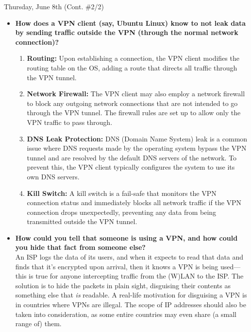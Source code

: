 \documentclass[11pt]{article}
\begin{document}
\begin{orangebox}{Thursday, June 8th (Cont. \#2/2)\vspace{-2em}\begin{flushright}\end{flushright}}
\begin{itemize}
    \item\textbf{How does a VPN client (say, Ubuntu Linux) know to not leak data by sending traffic outside the VPN (through the normal network connection)?}
    \begin{enumerate}
        \item\textbf{Routing:} Upon establishing a connection, the VPN client modifies the routing table on the OS, adding a route that directs all traffic through the VPN tunnel.
        \item\textbf{Network Firewall:} The VPN client may also employ a network firewall to block any outgoing network connections that are not intended to go through the VPN tunnel. The firewall rules are set up to allow only the VPN traffic to pass through.
        \item\textbf{DNS Leak Protection:} DNS (Domain Name System) leak is a common issue where DNS requests made by the operating system bypass the VPN tunnel and are resolved by the default DNS servers of the network. To prevent this, the VPN client typically configures the system to use its own DNS servers.
        \item\textbf{Kill Switch:} A kill switch is a fail-safe that monitors the VPN connection status and immediately blocks all network traffic if the VPN connection drops unexpectedly, preventing any data from being transmitted outside the VPN tunnel.
    \end{enumerate}
    \item\textbf{How could you tell that someone is using a VPN, and how could you hide that fact from someone else?} \\
    \phantom{~~~~} An ISP logs the data of its users, and when it expects to read that data and finds that it's encrypted upon arrival, then it knows a VPN is being used---this is true for anyone intercepting traffic from the (W)LAN to the ISP. The solution is to hide the packets in plain sight, disguising their contents as something else that \textit{is} readable. A real-life motivation for disguising a VPN is in countries where VPNs are illegal. The scope of IP addresses should also be taken into consideration, as some entire countries may even share (a small range of) them.

\end{itemize}
\end{orangebox}
\end{document}
